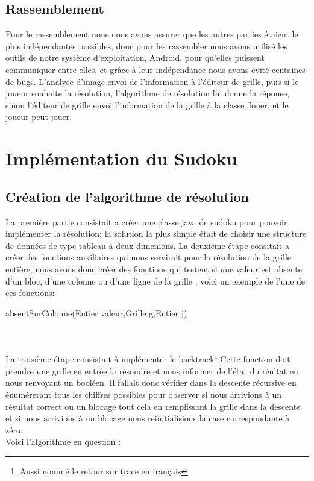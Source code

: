 \documentclass{article}
\begin{document}
\subsection*{Rassemblement}
Pour le rassemblement nous nous avons assurer que les autres parties étaient le plus indépendantes possibles, donc pour les rassembler nous avons utilisé les outils de notre système d'exploitation, Android, pour qu’elles puissent communiquer entre elles, et grâce à leur indépendance nous avons évité centaines de bugs. L’analyse d’image envoi de l’information à l'éditeur de grille, puis si le joueur souhaite la résolution, l’algorithme de résolution lui donne la réponse, sinon l'éditeur de grille envoi l’information de la grille à la classe Jouer, et le joueur peut jouer.



\newpage
\section{Implémentation du Sudoku}

\subsection{Création de l'algorithme de résolution}

La première partie consistait a créer une classe java de sudoku pour pouvoir implémenter la résolution; la solution la plus simple était de choisir une structure de données de type tableau à deux dimenions.
\newline
\newline La deuxième étape consitait a créer des fonctions auxiliaires qui nous servirait pour la résolution de la grille entière; nous avons donc créer des fonctions qui testent si une valeur est absente d'un bloc, d'une colonne ou d'une ligne de la grille ; voici un exemple de l'une de ces fonctions:\\


\begin{algorithm}[H]
\SetAlgoLined
{}
\caption{absentSurColonne(Entier valeur,Grille g,Entier j)}
\end{algorithm}\\\\


La troisième étape consistait à implémenter le backtrack\footnote{Aussi nommé le retour sur trace en français}.Cette fonction doit prendre une grille en entrée la résoudre et nous informer de l'état du réultat en nous renvoyant un booléen.
Il fallait donc vérifier dans la descente récursive en énumérerant tous les chiffres possibles pour observer si nous arrivions à un résultat correct ou un blocage tout cela en remplissant la grille dans la descente et si nous arrivions à un blocage nous reinitialisions la case correspondante à zéro.\\
Voici l'algorithme en question :
\end{document}
